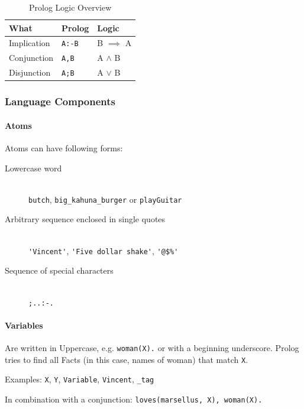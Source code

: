 \begin{table}[H]
	\centering
	\begin{tabu} to \linewidth {l l l}
		\toprule
		What & Prolog & Logic \\
		\midrule
		Implication & \lstinline|A:-B| & B $\implies$ A \\
		Conjunction & \lstinline|A,B| & A $\land$ B \\
		Disjunction & \lstinline|A;B|  & A $\lor$ B \\
		\bottomrule
	\end{tabu}
	\label{tbl:prologLogicOverview}
	\caption{Prolog Logic Overview}
\end{table}

\subsubsection{Language Components}

\paragraph{Atoms}

Atoms can have following forms: 

\begin{description}
	\item[Lowercase word] \hfill \\
		\lstinline|butch|, \lstinline|big_kahuna_burger| or \lstinline|playGuitar|
	\item[Arbitrary sequence enclosed in single quotes] \hfill \\
		\lstinline|'Vincent'|, \lstinline|'Five dollar shake'|, \lstinline|'@$%'|
	\item[Sequence of special characters] \hfill \\
		\lstinline|;..:-.|
\end{description}

\paragraph{Variables}

Are written in Uppercase, e.g. \lstinline|woman(X).| or with a beginning underscore. Prolog tries to find all Facts (in this case, names of woman) that match \lstinline|X|.

Examples: \lstinline|X|, \lstinline|Y|, \lstinline|Variable|, \lstinline|Vincent|, \lstinline|_tag|

In combination with a conjunction: \lstinline|loves(marsellus, X), woman(X).|

